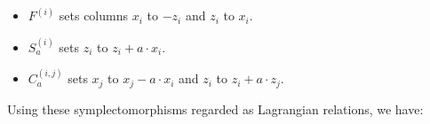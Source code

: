 \begin{itemize}
\item
$F^{(i)}$ sets columns $x_i$ to $-z_i$ and $z_i$ to $x_i$.

\item
$S_a^{(i)}$ sets $z_i$ to $z_i+a\cdot x_i$.


\item
$C_a^{(i,j)}$ sets $x_j$ to $x_j- a \cdot x_i$ and $z_i$ to $z_i+a\cdot z_j$.

\end{itemize}

Using these symplectomorphisms regarded as Lagrangian relations, we have:


